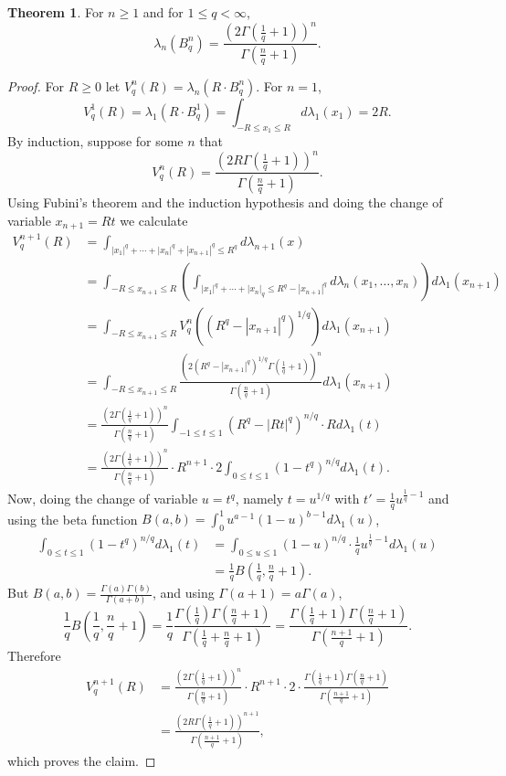 \documentclass{article}
\theoremstyle{definition}
\newtheorem{theorem}{Theorem}
\theoremstyle{definition}
\begin{document}
\begin{theorem}
For $n \geq 1$ and
for $1 \leq  q < \infty$,
\[
\lambda_n(B_q^n) =\frac{(2\Gamma(\frac{1}{q}+1))^n}{\Gamma(\frac{n}{q}+1)}.
\]
\end{theorem}
\begin{proof}
For $R \geq 0$ let $V_q^n(R) = \lambda_n(R \cdot B_q^n)$. 
For $n=1$,
\[
V_q^1(R) = \lambda_1(R \cdot B_q^1) = \int_{-R \leq x_1 \leq R} d\lambda_1(x_1)
=2R.
\]
By induction, suppose for some $n$ that
\[
V_q^n(R) = \frac{(2R \Gamma(\frac{1}{q}+1))^n}{\Gamma(\frac{n}{q}+1)}.
\]
Using Fubini's theorem and the induction hypothesis and doing the change of variable
$x_{n+1} = Rt$ we calculate
\begin{align*}
V_q^{n+1}(R)&=\int_{|x_1|^q+\cdots+|x_n|^q+|x_{n+1}|^q \leq R^q} d\lambda_{n+1}(x)\\
&=\int_{-R \leq x_{n+1} \leq R} \left( \int_{|x_1|^q+\cdots+|x_n|_q \leq R^q - |x_{n+1}|^q} d\lambda_n(x_1,\ldots,x_n)\right)
d\lambda_1(x_{n+1})\\
&=\int_{-R \leq x_{n+1} \leq R} V_q^n((R^q-|x_{n+1}|^q)^{1/q}) d\lambda_1(x_{n+1})\\
&=\int_{-R \leq x_{n+1} \leq R}  \frac{(2(R^q-|x_{n+1}|^q)^{1/q} \Gamma(\frac{1}{q}+1))^n}{\Gamma(\frac{n}{q}+1)}d\lambda_1(x_{n+1})\\
&=\frac{(2 \Gamma(\frac{1}{q}+1))^n}{\Gamma(\frac{n}{q}+1)} 
\int_{-1 \leq t \leq 1} (R^q-|Rt|^q)^{n/q} \cdot R d\lambda_1(t)\\
&=\frac{(2 \Gamma(\frac{1}{q}+1))^n}{\Gamma(\frac{n}{q}+1)}  \cdot R^{n+1} \cdot 2 \int_{0 \leq t \leq 1} (1-t^q)^{n/q} d\lambda_1(t).
\end{align*}
Now, doing the change of variable $u=t^q$, namely $t = u^{1/q}$ with $t' = \frac{1}{q} u^{\frac{1}{q}-1}$
and using the beta function $B(a,b) = \int_0^1 u^{a-1}(1-u)^{b-1} d\lambda_1(u)$,
\begin{align*}
\int_{0 \leq t \leq 1} (1-t^q)^{n/q} d\lambda_1(t)&=\int_{0 \leq u \leq 1} (1-u)^{n/q} \cdot  \frac{1}{q} u^{\frac{1}{q}-1} d\lambda_1(u)\\
&=\frac{1}{q} B\left(\frac{1}{q},\frac{n}{q}+1\right).
\end{align*}
But $B(a,b) = \frac{\Gamma(a) \Gamma(b)}{\Gamma(a+b)}$, and using $\Gamma(a+1)=a \Gamma(a)$, 
\[
\frac{1}{q} B\left(\frac{1}{q},\frac{n}{q}+1\right) = \frac{1}{q} \frac{\Gamma\left(\frac{1}{q}\right) \Gamma\left(\frac{n}{q}+1\right)}{\Gamma\left(\frac{1}{q}+\frac{n}{q}+1\right)}
=\frac{\Gamma\left(\frac{1}{q}+1\right) \Gamma\left( \frac{n}{q}+1\right)}{\Gamma\left(\frac{n+1}{q}+1\right)}.
\]
Therefore
\begin{align*}
V_q^{n+1}(R) &= \frac{(2 \Gamma(\frac{1}{q}+1))^n}{\Gamma(\frac{n}{q}+1)}  \cdot R^{n+1} \cdot 2 \cdot 
\frac{\Gamma\left(\frac{1}{q}+1\right) \Gamma\left( \frac{n}{q}+1\right)}{\Gamma\left(\frac{n+1}{q}+1\right)}\\
&=\frac{(2R\Gamma(\frac{1}{q}+1))^{n+1}}{\Gamma\left(\frac{n+1}{q}+1\right)},
\end{align*}
which proves the claim.
\end{proof}
\end{document}
